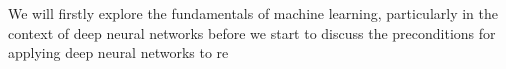 We will firstly explore the fundamentals of machine learning, particularly in the context of deep neural networks before we start to discuss the preconditions for applying deep neural networks to re